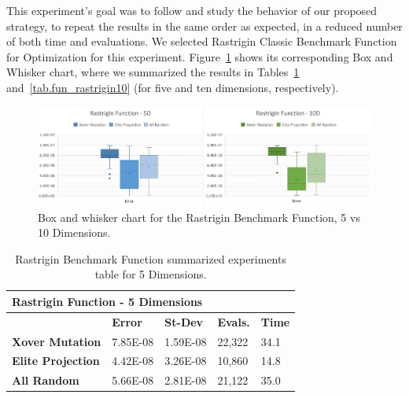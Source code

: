 \documentclass[graybox]{svmult}
\begin{document}
            This experiment's goal was to follow and study the behavior of our
            proposed strategy, to repeat the results in the same order as
            expected, in a reduced number of both time and evaluations. We
            selected Rastrigin Classic Benchmark Function for Optimization for
            this experiment. Figure~\ref{fig.fun_rastrigin} shows its
            corresponding Box and Whisker chart, where we summarized the
            results in Tables~\ref{tab.fun_rastrigin5} and~\ref{tab.fun_rastrigin10} 
            (for five and ten dimensions, respectively).

            \begin{figure}
                \includegraphics[width=0.99\linewidth, frame]{img/fig_fun_rastrigin.pdf}
                \caption{Box and whisker chart for the Rastrigin Benchmark Function, 5 vs 10 Dimensions.} \label{fig.fun_rastrigin}
                \end{figure}

            \begin{table}[]
                \scriptsize
                \centering
                \caption{Rastrigin Benchmark Function summarized experiments table for 5 Dimensions.}\label{tab.fun_rastrigin5}
                \begin{tabular}{@{}lllll@{}}
                \toprule
                \multicolumn{5}{l}{\textbf{Rastrigin Function - 5 Dimensions}} \\ \midrule
                & \textbf{Error} & \textbf{St-Dev} & \textbf{Evals.} & \textbf{Time} \\
                \textbf{Xover Mutation} & 7.85E-08 & 1.59E-08 & 22,322 & 34.1 \\
                \textbf{Elite Projection} & 4.42E-08 & 3.26E-08 & 10,860 & 14.8 \\
                \textbf{All Random} & 5.66E-08 & 2.81E-08 & 21,122 & 35.0 \\ \bottomrule
                \end{tabular}
                \end{table}
\end{document}
